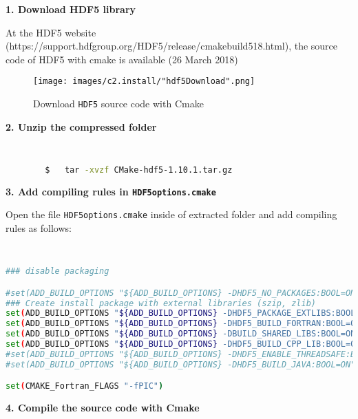 		\vspace{0.5cm}
		
		\textbf{1. Download HDF5 library}
		
		At the HDF5 website (https://support.hdfgroup.org/HDF5/release/cmakebuild518.html), the source code of HDF5 with cmake is available (26 March 2018)
		
		\vspace{0.5cm}
		{
			\begin{figure} [H]
				\centering
				\begin{tcolorbox}[standard jigsaw,opacityback=0]
					\texttt{[image: images/c2.install/"hdf5Download".png]}
				\end{tcolorbox}
				\vspace{0.3cm}
				\caption{Download \texttt{HDF5} source code with Cmake}			
				\label{fig:hdf5download}
			\end{figure}
		}
	
		\textbf{2. Unzip the compressed folder}
		
		\begin{lstlisting}[language=bash]
		

		$	tar -xvzf CMake-hdf5-1.10.1.tar.gz
		\end{lstlisting}
		
		\pagebreak		
		\textbf{3. Add compiling rules in \texttt{HDF5options.cmake}}
		
		Open the file \texttt{HDF5options.cmake} inside of extracted folder and add compiling rules as follows: 
		
		\begin{lstlisting}[language=bash]
		

### disable packaging

#set(ADD_BUILD_OPTIONS "${ADD_BUILD_OPTIONS} -DHDF5_NO_PACKAGES:BOOL=ON")
### Create install package with external libraries (szip, zlib)
set(ADD_BUILD_OPTIONS "${ADD_BUILD_OPTIONS} -DHDF5_PACKAGE_EXTLIBS:BOOL=ON")
set(ADD_BUILD_OPTIONS "${ADD_BUILD_OPTIONS} -DHDF5_BUILD_FORTRAN:BOOL=ON")
set(ADD_BUILD_OPTIONS "${ADD_BUILD_OPTIONS} -DBUILD_SHARED_LIBS:BOOL=ON")
set(ADD_BUILD_OPTIONS "${ADD_BUILD_OPTIONS} -DHDF5_BUILD_CPP_LIB:BOOL=ON")
#set(ADD_BUILD_OPTIONS "${ADD_BUILD_OPTIONS} -DHDF5_ENABLE_THREADSAFE:BOOL=ON")
#set(ADD_BUILD_OPTIONS "${ADD_BUILD_OPTIONS} -DHDF5_BUILD_JAVA:BOOL=ON")

set(CMAKE_Fortran_FLAGS "-fPIC")
		\end{lstlisting}
		
		\vspace{1em}
		\textbf{4. Compile the source code with Cmake}
		
